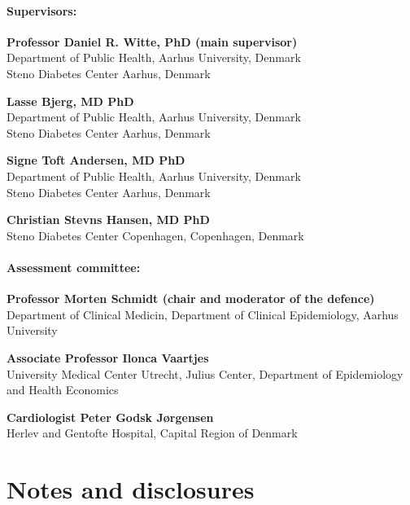 \documentclass[
  a4paper,
  headsepline=true,
  open=any]{scrbook}
\begin{document}
\hypertarget{supervisors}{%
\subsubsection*{Supervisors:}\label{supervisors}}

\textbf{Professor Daniel R. Witte, PhD (main supervisor)}\\
Department of Public Health, Aarhus University, Denmark\\
Steno Diabetes Center Aarhus, Denmark

\textbf{Lasse Bjerg, MD PhD}\\
Department of Public Health, Aarhus University, Denmark\\
Steno Diabetes Center Aarhus, Denmark

\textbf{Signe Toft Andersen, MD PhD}\\
Department of Public Health, Aarhus University, Denmark\\
Steno Diabetes Center Aarhus, Denmark

\textbf{Christian Stevns Hansen, MD PhD}\\
Steno Diabetes Center Copenhagen, Copenhagen, Denmark

\hypertarget{assessment-committee}{%
\subsubsection*{Assessment committee:}\label{assessment-committee}}

\textbf{Professor Morten Schmidt (chair and moderator of the defence)}\\
Department of Clinical Medicin, Department of Clinical Epidemiology,
Aarhus University

\textbf{Associate Professor Ilonca Vaartjes}\\
University Medical Center Utrecht, Julius Center, Department of
Epidemiology and Health Economics

\textbf{Cardiologist Peter Godsk Jørgensen}\\
Herlev and Gentofte Hospital, Capital Region of Denmark


\hypertarget{notes-and-disclosures}{%
\chapter*{Notes and disclosures}\label{notes-and-disclosures}}
\end{document}
